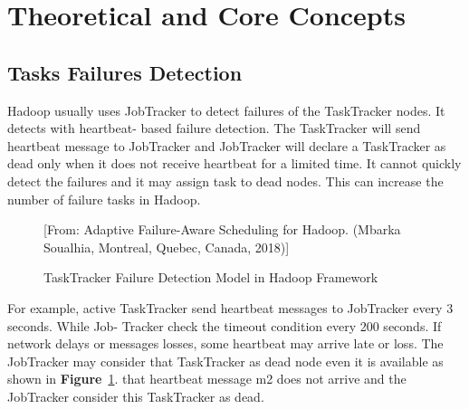\documentclass[12pt,oneside,openright,a4paper]{cpe-english-project}
\begin{document}
\section{Theoretical and Core Concepts}

\subsection{Tasks Failures Detection}

\hspace{10mm}Hadoop usually uses JobTracker to detect failures of the TaskTracker nodes. It detects with heartbeat- based failure detection. The TaskTracker will send heartbeat message to JobTracker and JobTracker will declare a TaskTracker as dead only when it does not receive heartbeat for a limited time. It cannot quickly detect the failures and it may assign task to dead nodes. This can increase the number of failure tasks in Hadoop.  \cite{adaptiveScheduling}

\begin{figure}[!h]\centering
  \setlength{\fboxrule}{0mm} %
  \setlength{\fboxsep}{0cm}
  \caption{TaskTracker Failure Detection Model in Hadoop Framework}\label{fig:tasktracker}
  [From: Adaptive Failure-Aware Scheduling for Hadoop. (Mbarka Soualhia, Montreal, Quebec, Canada, 2018)]
\end{figure}

\hspace{10mm}For example, active TaskTracker send heartbeat messages to JobTracker every 3 seconds. While Job- Tracker check the timeout condition every 200 seconds. If network delays or messages losses, some heartbeat may arrive late or loss. The JobTracker may consider that TaskTracker as dead node even it is available as shown in \textbf{Figure}~\ref{fig:tasktracker}. that heartbeat message m2 does not arrive and the JobTracker consider this TaskTracker as dead.
\end{document}

